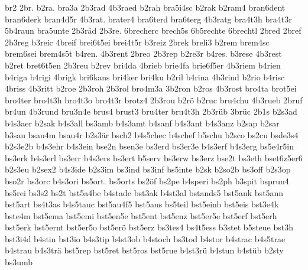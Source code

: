 {    br2
    2br.
    b2ra.
    bra3a
    2b3rad
    4b3raed
    b2rah
    bra5i4sc
    b2rak
    b2ram4
    bran6dent
    bran6derk
    bran4d5r
    4b3rat.
    brater4
    bra6terd
    bra6terg
    4b3ratg
    bra4t3h
    bra4t3r
    5b4raun
    bra5unte
    2b3räd
    2b3re.
    6brecherc
    brech5s
    6b5rechte
    6brechtl
    2bred
    2bref
    2b3reg
    b3reic
    4breif
    brei6t5ei
    brei4t5r
    b3reiz
    2brek
    breli3
    b2rem
    brem4sc
    brem6sei
    brem4s5t
    b4ren.
    4b3rent
    2breo
    2b3rep
    b2re3r
    b4res.
    b3rese
    4b3rest
    b2ret
    bret6t5en
    2b3reu
    b2rev
    bri4da
    4brieb
    brie4fa
    brie6f5er
    4b3riem
    b4rien
    b4riga
    b4rigi
    4brigk
    bri6kans
    bri4ker
    bri4ku
    b2ril
    b4rina
    4b3rind
    b2rio
    b4risc
    4briss
    4b3ritt
    b2roe
    2b3roh
    2b3rol
    bro4m3a
    3b2ron
    b2ros
    4b3rost
    bro4ta
    brot5ei
    bro4ter
    bro4t3h
    bro4t3o
    bro4t3r
    brotz4
    2b3rou
    b2rö
    b2ruc
    bru4chu
    4b3rueb
    2bruf
    br4un
    4b3rund
    bru3n4e
    brus4
    brust3
    bru4ter
    bru4t3h
    2b3rüb
    3brüc
    2b1s
    b2s3ad
    b4s3aer
    b2sak
    b4s3all
    bs3amb
    b4s3amt
    b4sanf
    b4s3ant
    b4s3anz
    b2sap
    b2sar
    b3sau
    bsau4m
    bsau4r
    b2s3är
    bsch2
    b4s5chec
    b4schef
    b5schu
    b2sco
    bs2cu
    bsde3s4
    b2s3e2b
    b4s3ehr
    b4s3ein
    bse2n
    bsen3e
    bs3erd
    bs3er3e
    b4s3erf
    b4s3erg
    bs5e4r5in
    bs3erk
    b4s3erl
    bs3err
    b4s3ers
    bs3ert
    b5serv
    bs3erw
    bs3erz
    bse2t
    bs3eth
    bset6z5er6
    b2s3eu
    b2sex2
    b4s3ide
    b2s3im
    bs3ind
    bs3inf
    bs5inte
    b2sk
    b2so2b
    bs3off
    b2s3op
    bso2r
    bs3orc
    b4s3ori
    bs5ort.
    bs5orts
    bs2öf
    bs2pe
    b4speri
    bs2ph
    b3spit
    bsprun4
    bs5rei
    bs3s2
    bs2t
    bst5a4be
    b4stade
    bst3ak
    b4st3al
    bstands5
    bst5ank
    bst5ann
    bst5art
    bs4t3as
    b4s5tauc
    bst5au4f5
    bst5aus
    bs5teil
    bst5einb
    bst5eis
    bst3e4k
    bste4m
    bst5ema
    bst5emi
    bst5en5e
    bst5ent
    bst5enz
    bst5er5e
    bst5erf
    bst5erh
    bst5erk
    bst5ernt
    bst5er5o
    bst5erö
    bst5erz
    bs3tes4
    bs4t5ess
    b3stet
    b5steue
    bst3h
    bst3i4d
    b4stin
    bst3io
    b4s3tip
    b4st3ob
    b4stoch
    bs3tod
    b4stor
    b4strac
    b4s5trae
    b4strau
    b4s3trä
    bst5rep
    bst5ret
    bst5ros
    bst5rue
    b4st3rü
    b4stun
    b4stüb
    b2sty
    bs3umb
}
